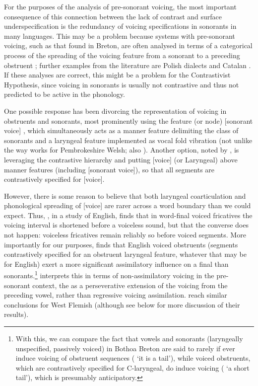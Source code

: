 For the purposes of the analysis of pre\hyp sonorant voicing, the most important consequence of this connection between the lack of contrast and surface underspecification is the redundancy of voicing specifications in sonorants in many languages. This may be a problem because systems with pre\hyp sonorant voicing, such as that found in Breton, are often analysed in terms of a categorical process of the spreading of the voicing feature from a sonorant to a preceding obstruent \citep{kramer-breton,hall09:_laryn_breton}; further examples from the literature are Polish dialects \citep{rubach96:_nonsy_analy_voice_assim_polis} and Catalan \citep{bermudez-otero01:_voicin_catal,jimenez08:_asimet}. If these analyses are correct, this might be a problem for the Contrastivist Hypothesis, since voicing in sonorants is usually not contrastive and thus not predicted to be active in the phonology.

One possible response has been divorcing the representation of voicing in obstruents and sonorants, most prominently using the feature (or node) [sonorant voice] \citep[e.\,g.\@][]{rice89,piggott92:_variab_featur_depen,rice1993,avery96:_repres_of_voicin_contr,currie07}, which simultaneously acts as a manner feature delimiting the class of sonorants and a laryngeal feature implemented as vocal fold vibration (not unlike the way  works for Pembrokeshire Welsh; \cf also \citealp{blaho-diss}). Another option, noted by \citet{hall09:_laryn_breton}, is leveraging the contrastive hierarchy and putting [voice] (or Laryngeal) above manner features (including [sonorant voice]), so that all segments are contrastively specified for [voice].

However, there is some reason to believe that both laryngeal coarticulation and phonological spreading of [voice] are rarer across a word boundary than we could expect. Thus, \citet{myers10:_regres}, in a study of English, finds that in word-final voiced fricatives the voicing interval is shortened before a voiceless sound, but that the converse does not happen: voiceless fricatives remain reliably so before voiced segments. More importantly for our purposes, \citet{jansen04:_laryn,jansen07:_phonol_englis} finds that English voiced obstruents (\ie segments contrastively specified for an obstruent laryngeal feature, whatever that may be for English) exert a more significant assimilatory influence on a final \ipa{[z]} than sonorants.\footnote{With this, we can compare the fact that vowels and sonorants (laryngeally unspecified, \ie passively voiced) in Bothoa Breton are said to rarely if ever induce voicing of obstruent sequences ( `it is a tail'), while voiced obstruents, which are contrastively specified for C-laryngeal, do induce voicing ( `a short tail'), which is presumably anticipatory.} \citeauthor{jansen04:_laryn} interprets this in terms of non-assimilatory voicing in the pre-sonorant context, \ie the as a perseverative extension of the voicing from the preceding vowel, rather than regressive voicing assimilation. \citet{strycharczuk11:_explain} reach similar conclusions for West Flemish (although see below for more discussion of their results).


